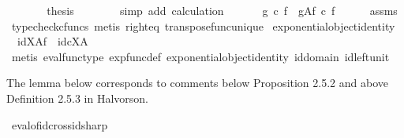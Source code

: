 \begin{isabellebody}
\ \ \ \ \isamarkupfalse%
\ \isamarkupfalse%
\ {\isacharquery}{\kern0pt}thesis\isanewline
\ \ \ \ \ \ \isamarkupfalse%
\ {\isacharparenleft}{\kern0pt}simp\ add{\isacharcolon}{\kern0pt}\ calculation{\isacharparenright}{\kern0pt}\isanewline
\ \ \isamarkupfalse%
\isanewline
\ \ \isamarkupfalse%
\ {\isachardoublequoteopen}{\isacharparenleft}{\kern0pt}g\ {\isasymcirc}\isactrlsub c\ f{\isacharparenright}{\kern0pt}\isactrlsup {\isasymsharp}\ {\isacharequal}{\kern0pt}\ g\isactrlbsup A\isactrlesup \isactrlsub f\ {\isasymcirc}\isactrlsub c\ f\isactrlsup {\isasymsharp}{\isachardoublequoteclose}\isanewline
\ \ \ \ \isamarkupfalse%
\ assms\ \isamarkupfalse%
\ {\isacharparenleft}{\kern0pt}typecheck{\isacharunderscore}{\kern0pt}cfuncs{\isacharcomma}{\kern0pt}\ metis\ right{\isacharunderscore}{\kern0pt}eq\ transpose{\isacharunderscore}{\kern0pt}func{\isacharunderscore}{\kern0pt}unique{\isacharparenright}{\kern0pt}\isanewline
{}\isamarkupfalse%
%
\endisatagproof
{\isafoldproof}%
%
\isadelimproof
\isanewline
%
\endisadelimproof
\isanewline
{}\isamarkupfalse%
\ exponential{\isacharunderscore}{\kern0pt}object{\isacharunderscore}{\kern0pt}identity{}{\isacharcolon}{\kern0pt}\ \isanewline
\ \ {\isachardoublequoteopen}id{\isacharparenleft}{\kern0pt}X{\isacharparenright}{\kern0pt}\isactrlbsup A\isactrlesup \isactrlsub f\ {\isacharequal}{\kern0pt}\ id\isactrlsub c{\isacharparenleft}{\kern0pt}X\isactrlbsup A\isactrlesup {\isacharparenright}{\kern0pt}{\isachardoublequoteclose}\isanewline
%
\isadelimproof
\ \ %
\endisadelimproof
%
\isatagproof
{}\isamarkupfalse%
\ {\isacharparenleft}{\kern0pt}metis\ eval{\isacharunderscore}{\kern0pt}func{\isacharunderscore}{\kern0pt}type\ exp{\isacharunderscore}{\kern0pt}func{\isacharunderscore}{\kern0pt}def\ exponential{\isacharunderscore}{\kern0pt}object{\isacharunderscore}{\kern0pt}identity\ id{\isacharunderscore}{\kern0pt}domain\ id{\isacharunderscore}{\kern0pt}left{\isacharunderscore}{\kern0pt}unit{}{\isacharparenright}{\kern0pt}%
\endisatagproof
{\isafoldproof}%
%
\isadelimproof
%
\endisadelimproof
%
\begin{isamarkuptext}%
The lemma below corresponds to comments below Proposition 2.5.2 and above Definition 2.5.3 in Halvorson.%
\end{isamarkuptext}\isamarkuptrue%
\isamarkupfalse%
\ eval{\isacharunderscore}{\kern0pt}of{\isacharunderscore}{\kern0pt}id{\isacharunderscore}{\kern0pt}cross{\isacharunderscore}{\kern0pt}id{\isacharunderscore}{\kern0pt}sharp{}{\isacharcolon}{\kern0pt}\isanewline

\end{isabellebody}
